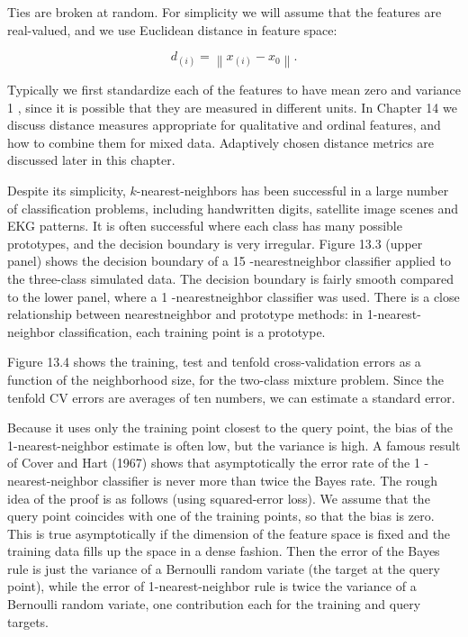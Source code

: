 \documentclass[10pt]{article}
\begin{document}
Ties are broken at random. For simplicity we will assume that the features are real-valued, and we use Euclidean distance in feature space:


\begin{equation*}
d_{(i)}=\left\|x_{(i)}-x_{0}\right\| . \tag{13.1}
\end{equation*}


Typically we first standardize each of the features to have mean zero and variance 1 , since it is possible that they are measured in different units. In Chapter 14 we discuss distance measures appropriate for qualitative and ordinal features, and how to combine them for mixed data. Adaptively chosen distance metrics are discussed later in this chapter.

Despite its simplicity, $k$-nearest-neighbors has been successful in a large number of classification problems, including handwritten digits, satellite image scenes and EKG patterns. It is often successful where each class has many possible prototypes, and the decision boundary is very irregular. Figure 13.3 (upper panel) shows the decision boundary of a 15 -nearestneighbor classifier applied to the three-class simulated data. The decision boundary is fairly smooth compared to the lower panel, where a 1 -nearestneighbor classifier was used. There is a close relationship between nearestneighbor and prototype methods: in 1-nearest-neighbor classification, each training point is a prototype.

Figure 13.4 shows the training, test and tenfold cross-validation errors as a function of the neighborhood size, for the two-class mixture problem. Since the tenfold CV errors are averages of ten numbers, we can estimate a standard error.

Because it uses only the training point closest to the query point, the bias of the 1-nearest-neighbor estimate is often low, but the variance is high. A famous result of Cover and Hart (1967) shows that asymptotically the error rate of the 1 -nearest-neighbor classifier is never more than twice the Bayes rate. The rough idea of the proof is as follows (using squared-error loss). We assume that the query point coincides with one of the training points, so that the bias is zero. This is true asymptotically if the dimension of the feature space is fixed and the training data fills up the space in a dense fashion. Then the error of the Bayes rule is just the variance of a Bernoulli random variate (the target at the query point), while the error of 1-nearest-neighbor rule is twice the variance of a Bernoulli random variate, one contribution each for the training and query targets.
\end{document}
